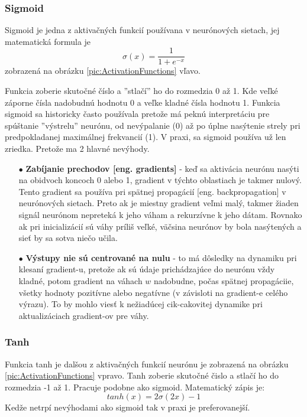 \subsubsection{Sigmoid}
Sigmoid je jedna z aktivačných funkcií používana v neurónových sietach, jej matematická formula je
\begin{equation}
    \sigma(x) = \frac{1}{1 + e^{-x}}
\end{equation}
zobrazená na obrázku \ref{pic:ActivationFunctions} vľavo.

Funkcia zoberie skutočné číslo a ''stlačí'' ho do rozmedzia 0 až 1.
Kde veľké záporne čísla nadobudnú hodnotu 0 a veľke kladné čísla hodnotu 1.
Funkcia sigmoid sa historicky často používala pretože má peknú interpretáciu pre spúštanie ''výstrelu'' neurónu,
    od nevýpalanie (0) až po úplne nasýtenie strely pri predpokladanej maximálnej frekvancií (1).
V praxi, sa sigmoid používa už len zriedka.
Pretože ma 2 hlavné nevýhody\cite{odkaz:ConvolutionalNeuralNetworkCS231n}.
\begin{enumerate}
    \item[$\bullet$] \textbf{Zabíjanie prechodov [eng. gradients]} - keď sa aktivácia neurónu nasýti na obidvoch koncoch 0 alebo 1, gradient v týchto oblastiach je takmer nulový.
    Tento gradient sa používa pri spätnej propagácií [eng. backpropagation] v neurónových sietach. Preto ak je miestny gradient veľmi malý, takmer žiaden signál
    neurónom nepreteká k jeho váham a rekurzívne k jeho dátam. Rovnako ak pri inicializácií sú váhy príliš veľké, väčsina neurónov by bola nasýtených a sieť by sa sotva niečo učila.
    \item[$\bullet$] \textbf{Výstupy nie sú centrované na nulu} - to má dôsledky na dynamiku pri klesaní gradient-u, pretože ak sú údaje prichádzajúce do neurónu vždy kladné,
    potom gradient na váhach $w$ nadobudne, počas spätnej propagáciie, všetky hodnoty pozitívne alebo negatívne (v závisloti na gradient-e celého výrazu).
    To by mohlo viesť k nežiadúcej cik-cakovitej dynamike pri aktualizáciach gradient-ov pre váhy.
\end{enumerate}


\subsubsection{Tanh}
Funkcia tanh je dalšou z aktivačných funkcií neurónu je zobrazená na obrázku \ref{pic:ActivationFunctions} vpravo.
Tanh zoberie skutočné čislo a stlačí ho do rozmedzia -1 až 1. Pracuje podobne ako sigmoid.
Matematický zápis je\cite{odkaz:ConvolutionalNeuralNetworkCS231n}:
\begin{equation}
    tanh(x) = 2\sigma(2x) - 1
\end{equation}
Kedže netrpí nevýhodami ako sigmoid tak v praxi je preferovanejší.


